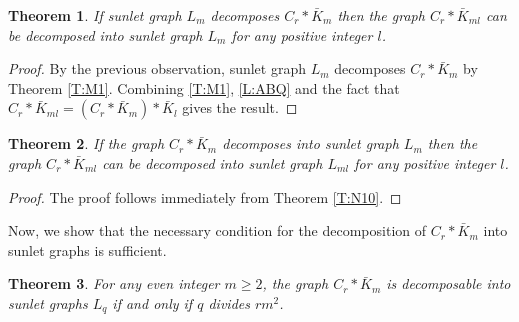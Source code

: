 \documentclass[12pt]{report}
\newtheorem{thm}{Theorem}[section]
\begin{document}
\begin{thm}
If sunlet graph $L_m$ decomposes  $C_{r}*\bar{K}_{m}$ then the graph
$C_{r}*\bar{K}_{ml}$ can be decomposed into sunlet graph $L_m$ for
any positive integer $l$.
\end{thm}
\begin{proof}
By the previous observation, sunlet graph $L_m$ decomposes
$C_{r}*\bar{K}_{m}$ by Theorem  \ref{T:M1}. Combining \ref{T:M1},
\ref{L:ABQ} and the fact that
$C_r*\bar{K}_{ml}=(C_r*\bar{K}_m)*\bar{K}_l$ gives the result.
\end{proof}
\begin{thm}
If the graph $C_{r}*\bar{K}_{m}$ decomposes into sunlet graph $L_m$
then the graph $C_{r}*\bar{K}_{ml}$ can be decomposed  into sunlet
graph $L_{ml}$ for any positive integer $l$.
\end{thm}
\begin{proof}
The proof follows immediately from Theorem \ref{T:N10}.
\end{proof}
Now, we show that the necessary condition for the decomposition of $C_{r}*\bar{K}_{m}$ into sunlet graphs is sufficient.
\begin{thm}
For any even integer $m\geq 2$, the graph $C_{r}*\bar{K}_{m}$ is
decomposable into sunlet graphs $L_{q}$ if and only if $q$ divides
$rm^{2}$.
\end{thm}
\end{document}

